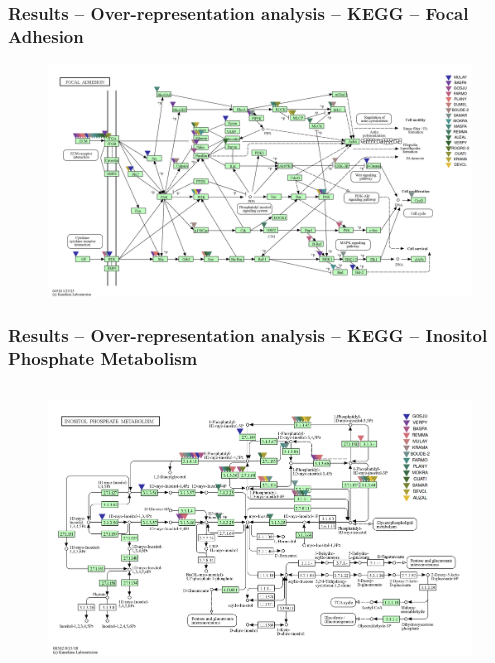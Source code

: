 \documentclass[aspectratio=169, 9pt]{beamer}
\begin{document}
\begin{frame}
    \frametitle{ Results -- Over-representation analysis -- KEGG -- Focal Adhesion}
    \begin{figure}
        \includegraphics[width=.95\textwidth]{Images/hsa04510.png}
    \end{figure}
\end{frame}

\begin{frame}
    \frametitle{ Results -- Over-representation analysis -- KEGG -- Inositol Phosphate Metabolism}
    \begin{columns}[T]
        \begin{column}{.75\textwidth}
            \begin{figure}
                \includegraphics[width=\textwidth]{Images/hsa00562.png}
            \end{figure}
        \end{column}
    \end{columns}
\end{frame}
\end{document}
